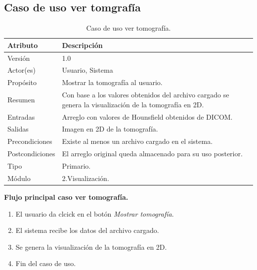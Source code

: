 \documentclass[12pt]{report}
\begin{document}
\subsection{Caso de uso ver tomgrafía}
\begin{table}[H]
\begin{center}
\begin{tabular}{p{30mm}p{80mm}}
\hline
Atributo & Descripción\\
\hline \hline 
Versión & 1.0\\
Actor(es) & Usuario, Sistema\\
Propósito & Mostrar la tomografía al usuario.\\
Resumen & Con base a los valores obtenidos del archivo cargado se genera la visualización de la tomografía en 2D.\\
Entradas & Arreglo con valores de Hounsfield obtenidos de DICOM.\\
Salidas & Imagen en 2D de la tomografía.\\
Precondiciones & Existe al menos un archivo cargado en el sistema.\\
Postcondiciones & El arreglo original queda almacenado para su uso posterior.\\
Tipo & Primario.\\
Módulo & 2.Visualización.\\
\hline \hline
\end{tabular}
\caption{Caso de uso ver tomografía.}
\end{center}
\end{table}

\textbf{Flujo principal caso ver tomografía. }
\begin{enumerate}
\item El usuario da clcick en el botón \textit{Mostrar tomografía}.
\item El sistema recibe los datos del archivo cargado.
\item Se genera la visualización de la tomografía en 2D.
\item Fin del caso de uso.
\end{enumerate}
\end{document}
